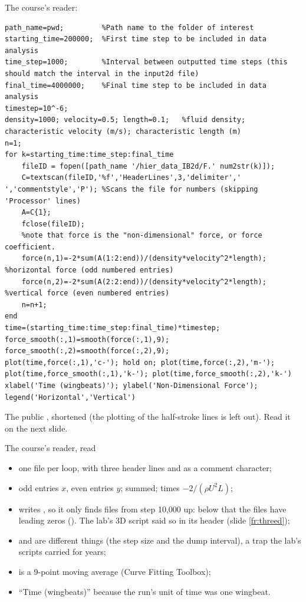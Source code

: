 \documentclass[aspectratio=169,11pt]{beamer}
\begin{document}
\begin{frame}[fragile]{The course's reader: }
\label{fr:dataread}
\begin{lstlisting}[style=matlabtiny]
path_name=pwd;         %Path name to the folder of interest
starting_time=200000;  %First time step to be included in data analysis
time_step=1000;        %Interval between outputted time steps (this should match the interval in the input2d file)
final_time=4000000;    %Final time step to be included in data analysis
timestep=10^-6;
density=1000; velocity=0.5; length=0.1;   %fluid density; characteristic velocity (m/s); characteristic length (m)
n=1;
for k=starting_time:time_step:final_time
    fileID = fopen([path_name '/hier_data_IB2d/F.' num2str(k)]);
    C=textscan(fileID,'%f','HeaderLines',3,'delimiter',' ','commentstyle','P'); %Scans the file for numbers (skipping 'Processor' lines)
    A=C{1};
    fclose(fileID);
    %note that force is the "non-dimensional" force, or force coefficient.
    force(n,1)=-2*sum(A(1:2:end))/(density*velocity^2*length);  %horizontal force (odd numbered entries)
    force(n,2)=-2*sum(A(2:2:end))/(density*velocity^2*length);  %vertical force (even numbered entries)
    n=n+1;
end
time=(starting_time:time_step:final_time)*timestep;
force_smooth(:,1)=smooth(force(:,1),9);
force_smooth(:,2)=smooth(force(:,2),9);
plot(time,force(:,1),'c-'); hold on; plot(time,force(:,2),'m-');
plot(time,force_smooth(:,1),'k-'); plot(time,force_smooth(:,2),'k-')
xlabel('Time (wingbeats)'); ylabel('Non-Dimensional Force'); legend('Horizontal','Vertical')
\end{lstlisting}
\footnotesize The public , shortened (the plotting of the half-stroke lines is left out). Read it on the next slide.
\end{frame}

\begin{frame}{The course's reader, read}
\label{fr:dataread2}
\small
\begin{itemize}
  \item one  file per loop,  with three header lines and  as a comment character;
  \item odd entries $x$, even entries $y$; summed; times $-2/(\rho U^2 L)$;
  \item {} writes , so it only finds files from step 10,000 up: below that the files have leading zeros (). The lab's 3D script said so in its header (slide \ref{fr:threed});
  \item {} and  are different things (the step size and the dump interval), a trap the lab's scripts carried for years;
  \item {} is a 9-point moving average (Curve Fitting Toolbox);
  \item ``Time (wingbeats)'' because the run's unit of time was one wingbeat.
\end{itemize}
\end{frame}
\end{document}
